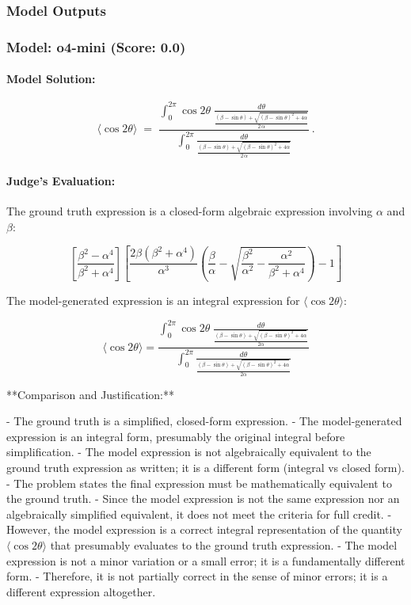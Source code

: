 \documentclass[10pt]{article}
\begin{document}
\subsubsection*{Model Outputs}
\subsubsection*{Model: o4-mini (Score: 0.0)}
\paragraph*{Model Solution:}
\[ \big\langle\cos2\theta\big\rangle
\;=\;
\frac{
  \displaystyle
  \int_{0}^{2\pi}
     \cos2\theta\;\frac{d\theta}{\displaystyle
        \frac{(\beta-\sin\theta)+\sqrt{(\beta-\sin\theta)^2+4\alpha}}{2\,\alpha}
     }
}
{
  \displaystyle
  \int_{0}^{2\pi}
     \frac{d\theta}{\displaystyle
        \frac{(\beta-\sin\theta)+\sqrt{(\beta-\sin\theta)^2+4\alpha}}{2\,\alpha}
     }
}\,. \]

\paragraph*{Judge's Evaluation:}

The ground truth expression is a closed-form algebraic expression involving $\alpha$ and $\beta$:

\[
\left[\frac{\beta^2 - \alpha^4}{\beta^2 + \alpha^4}\right] \left[ \frac{2\beta(\beta^2 + \alpha^4)}{\alpha^3}\left(\frac{\beta}{\alpha} - \sqrt{\frac{\beta^2}{\alpha^2} - \frac{\alpha^2}{\beta^2 + \alpha^4}} \right) - 1\right]
\]

The model-generated expression is an integral expression for $\langle \cos 2\theta \rangle$:

\[
\langle \cos 2\theta \rangle = \frac{
  \displaystyle
  \int_{0}^{2\pi}
     \cos 2\theta \; \frac{d\theta}{
        \frac{(\beta - \sin\theta) + \sqrt{(\beta - \sin\theta)^2 + 4\alpha}}{2\alpha}
     }
}{
  \displaystyle
  \int_{0}^{2\pi}
     \frac{d\theta}{
        \frac{(\beta - \sin\theta) + \sqrt{(\beta - \sin\theta)^2 + 4\alpha}}{2\alpha}
     }
}
\]

**Comparison and Justification:**

- The ground truth is a simplified, closed-form expression.
- The model-generated expression is an integral form, presumably the original integral before simplification.
- The model expression is not algebraically equivalent to the ground truth expression as written; it is a different form (integral vs closed form).
- The problem states the final expression must be mathematically equivalent to the ground truth.
- Since the model expression is not the same expression nor an algebraically simplified equivalent, it does not meet the criteria for full credit.
- However, the model expression is a correct integral representation of the quantity $\langle \cos 2\theta \rangle$ that presumably evaluates to the ground truth expression.
- The model expression is not a minor variation or a small error; it is a fundamentally different form.
- Therefore, it is not partially correct in the sense of minor errors; it is a different expression altogether.
\end{document}
